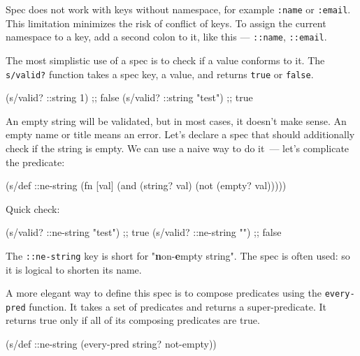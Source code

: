 
Spec does not work with keys without namespace, for example \verb|:name| or \verb|:email|. This limitation minimizes the risk of conflict of keys. To assign the current namespace to a key, add a second colon to it, like this — \verb|::name|, \verb|::email|.


The most simplistic use of a spec is to check if a value conforms to it. The \verb|s/valid?| function takes a spec key, a value, and returns \verb|true| or \verb|false|.

\begin{english}
  \begin{clojure}
(s/valid? ::string 1)      ;; false
(s/valid? ::string "test") ;; true
  \end{clojure}
\end{english}

An empty string will be validated, but in most cases, it doesn't make sense. An empty name or title means an error. Let's declare a spec that should additionally check if the string is empty. We can use a naive way to do it~--- let's complicate the predicate:


\begin{english}
  \begin{clojure}
(s/def ::ne-string
  (fn [val]
    (and (string? val)
         (not (empty? val)))))
  \end{clojure}
\end{english}

\noindent
Quick check:

\begin{english}
  \begin{clojure}
(s/valid? ::ne-string "test") ;; true
(s/valid? ::ne-string "")     ;; false
  \end{clojure}
\end{english}

The \verb|::ne-string| key is short for "\textbf{n}on-\textbf{e}mpty
string". The spec is often used: so it is logical to shorten its name.

A more elegant way to define this spec is to compose predicates using the \verb|every-pred| function. It takes a set of predicates and returns a super-predicate. It returns true only if all of its composing predicates are true.

\begin{english}
  \begin{clojure}
(s/def ::ne-string
  (every-pred string? not-empty))
  \end{clojure}
\end{english}

